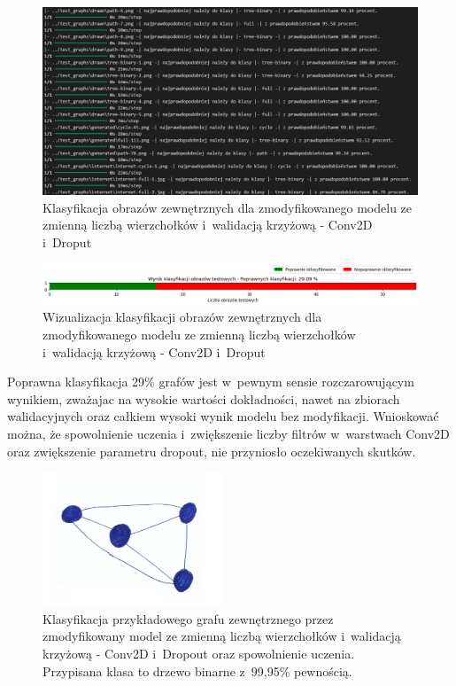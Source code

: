 \begin{figure}[ht]
	\centering
	\includegraphics[width=15.5cm]{resources/tests/images/v4/multiple_edges_crossvalid_1_txt.png}
	\caption{Klasyfikacja obrazów zewnętrznych dla zmodyfikowanego modelu ze zmienną liczbą wierzchołków i~walidacją krzyżową - Conv2D i~Droput}
	\label{Fig:tests-csvar-1b}
\end{figure}
\FloatBarrier

\begin{figure}[ht]
	\centering
	\includegraphics[width=15.5cm]{resources/tests/images/v4/multiple_edges_crossvalid_1_bar.png}
	\caption{Wizualizacja klasyfikacji obrazów zewnętrznych dla zmodyfikowanego modelu ze zmienną liczbą wierzchołków i~walidacją krzyżową - Conv2D i~Droput}
	\label{Fig:tests-csvar-1c}
\end{figure}
\FloatBarrier

Poprawna klasyfikacja 29\% grafów jest w~pewnym sensie rozczarowującym wynikiem,
zważajac na wysokie wartości dokładności, nawet na zbiorach walidacyjnych
oraz całkiem wysoki wynik modelu bez modyfikacji.
Wnioskować można, że spowolnienie uczenia i~zwiększenie liczby filtrów w~warstwach Conv2D oraz zwiększenie parametru dropout,
nie przyniosło oczekiwanych skutków.

\begin{figure}[ht]
	\centering
	\includegraphics[height=4cm]{../graph_classification/test_graphs/drawn/full-10.png}
	\caption{Klasyfikacja przykładowego grafu zewnętrznego przez
		zmodyfikowany model ze zmienną liczbą wierzchołków i~walidacją krzyżową - Conv2D i~Dropout oraz spowolnienie uczenia.
		Przypisana klasa to drzewo binarne z~99,95\% pewnością.}
	\label{Fig:tests-cv-1d}
\end{figure}
\FloatBarrier


